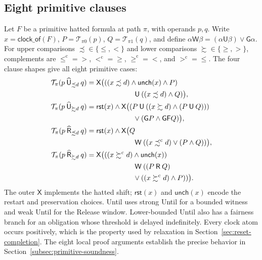 \documentclass{ieeeaccess}
\newcommand{\Until}{\mathbin{\mathsf{U}}}
\newcommand{\Release}{\mathbin{\mathsf{R}}}
\newcommand{\hUntil}{\mathbin{\widehat{\mathsf{U}}}}
\newcommand{\hRelease}{\mathbin{\widehat{\mathsf{R}}}}
\newcommand{\Next}{\mathsf{X}}
\newcommand{\Always}{\mathsf{G}}
\newcommand{\Eventually}{\mathsf{F}}
\newcommand{\WeakUntil}{\mathbin{\mathsf{W}}}
\newcommand{\Reset}{\mathsf{rst}}
\newcommand{\Unch}{\mathsf{unch}}
\newcommand{\T}{\mathcal{T}}
\begin{document}
\subsection{Eight primitive clauses}
\label{sec:mtlbuchi}
Let $F$ be a primitive hatted formula at path $\pi$, with operands $p,q$.
Write $x=\mathsf{clock\_of}(F)$, $P=\T_{\pi0}(p)$,
$Q=\T_{\pi1}(q)$, and define
$\alpha\WeakUntil\beta=(\alpha\Until\beta)\lor\Always\alpha$.
For upper comparisons $\precsim\in\{\le,<\}$ and lower comparisons
$\succsim\in\{\ge,>\}$, complements are
$\le^{\mathrm c}=>$, $<^{\mathrm c}=\ge$, $\ge^{\mathrm c}=<$, and
$>^{\mathrm c}=\le$. The four clause shapes give all eight primitive cases:
\begin{align}
\T_\pi(p\hUntil_{\precsim d}q)
 &=\Next\bigl(((x\precsim d)\land\Unch(x)\land P)\nonumber\\
 &\hspace{23mm}\Until((x\precsim d)\land Q)\bigr),\label{eq:t-hule}\\
\T_\pi(p\hUntil_{\succsim d}q)
 &=\Reset(x)\land\Next\bigl((P\Until((x\succsim d)\land(P\Until Q)))\nonumber\\
 &\hspace{23mm}\lor(\Always P\land\Always\Eventually Q)\bigr),\label{eq:t-huge}\\
\T_\pi(p\hRelease_{\precsim d}q)
 &=\Reset(x)\land\Next\bigl(Q\nonumber\\
 &\hspace{23mm}\WeakUntil((x\mathrel{\precsim^{\mathrm c}}d)\lor(P\land Q))\bigr),\label{eq:t-hrle}\\
\T_\pi(p\hRelease_{\succsim d}q)
 &=\Next\bigl(((x\mathrel{\succsim^{\mathrm c}}d)\land\Unch(x))\nonumber\\
 &\hspace{23mm}\WeakUntil((P\Release Q)\nonumber\\
 &\hspace{23mm}\lor((x\mathrel{\succsim^{\mathrm c}}d)\land P))\bigr).
 \label{eq:t-hrge}
\end{align}
The outer $\Next$ implements the hatted shift; $\Reset(x)$ and $\Unch(x)$
encode the restart and preservation choices. Until uses strong Until for a
bounded witness and weak Until for the Release window. Lower-bounded Until
also has a fairness branch for an obligation whose threshold is delayed
indefinitely. Every clock atom occurs positively, which is the property used
by relaxation in Section~\ref{sec:reset-completion}. The eight local proof
arguments establish the precise behavior in
Section~\ref{subsec:primitive-soundness}.
\end{document}

